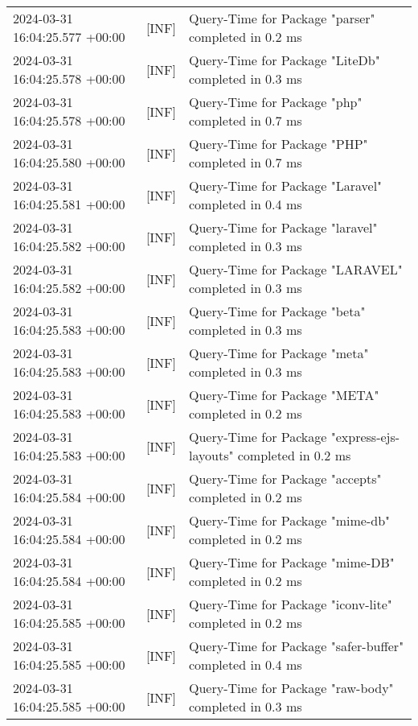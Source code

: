 {{\begin{tabularx}{\textwidth}{|l|l|X|}
                    2024-03-31 16:04:25.577 +00:00 & [INF] & Query-Time for Package "parser" completed in 0.2 ms \\
                    2024-03-31 16:04:25.578 +00:00 & [INF] & Query-Time for Package "LiteDb" completed in 0.3 ms \\
                    2024-03-31 16:04:25.578 +00:00 & [INF] & Query-Time for Package "php" completed in 0.7 ms \\
                    2024-03-31 16:04:25.580 +00:00 & [INF] & Query-Time for Package "PHP" completed in 0.7 ms \\
                    2024-03-31 16:04:25.581 +00:00 & [INF] & Query-Time for Package "Laravel" completed in 0.4 ms \\
                    2024-03-31 16:04:25.582 +00:00 & [INF] & Query-Time for Package "laravel" completed in 0.3 ms \\
                    2024-03-31 16:04:25.582 +00:00 & [INF] & Query-Time for Package "LARAVEL" completed in 0.3 ms \\
                    2024-03-31 16:04:25.583 +00:00 & [INF] & Query-Time for Package "beta" completed in 0.3 ms \\
                    2024-03-31 16:04:25.583 +00:00 & [INF] & Query-Time for Package "meta" completed in 0.3 ms \\
                    2024-03-31 16:04:25.583 +00:00 & [INF] & Query-Time for Package "META" completed in 0.2 ms \\
                    2024-03-31 16:04:25.583 +00:00 & [INF] & Query-Time for Package "express-ejs-layouts" completed in 0.2 ms \\
                    2024-03-31 16:04:25.584 +00:00 & [INF] & Query-Time for Package "accepts" completed in 0.2 ms \\
                    2024-03-31 16:04:25.584 +00:00 & [INF] & Query-Time for Package "mime-db" completed in 0.2 ms \\
                    2024-03-31 16:04:25.584 +00:00 & [INF] & Query-Time for Package "mime-DB" completed in 0.2 ms \\
                    2024-03-31 16:04:25.585 +00:00 & [INF] & Query-Time for Package "iconv-lite" completed in 0.2 ms \\
                    2024-03-31 16:04:25.585 +00:00 & [INF] & Query-Time for Package "safer-buffer" completed in 0.4 ms \\
                    2024-03-31 16:04:25.585 +00:00 & [INF] & Query-Time for Package "raw-body" completed in 0.3 ms \\

\end{tabularx}}}
